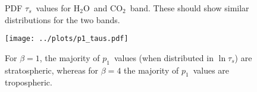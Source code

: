 \documentclass[10pt]{article}
\newcommand{\cotwo}{\ensuremath{\mathrm{CO_2}}}
\newcommand{\htwo}{\ensuremath{\mathrm{H_2O}}}
\newcommand{\pem}{\ensuremath{p_1}}
\newcommand{\taus}{\ensuremath{\tau_s}}
\begin{document}
\begin{figure}[h!]
	\begin{center}
		\caption{PDF \taus\ values for \htwo\ and \cotwo\ band. These should show similar distributions for the two bands.
		\label{taus_pdf}
		}
	\end{center}
\end{figure}

\begin{figure}[h!]
	\begin{center}
			\texttt{[image: ../plots/p1\_taus.pdf]}
		\caption{For $\beta=1$, the majority of \pem\ values (when distributed in $\ln \taus$) are stratospheric, whereas for $\beta=4$ the majority of \pem\ values are tropospheric.
		\label{p1_taus}
		}
	\end{center}
\end{figure}




\pagebreak



\end{document}
